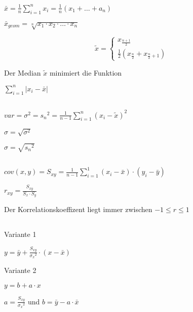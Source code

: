 \documentclass[10pt,a4paper,landscape]{article}
\begin{document}
\begin{multicols*}{4}
\section{}
\subsection{}
\parbox{\columnwidth}{\centering$\bar{x}=\frac{1}{n}\sum \limits_{i=1}^n x_i=\frac{1}{n}(x_1 + \dots + a_n)$}
\parbox{\columnwidth}{\centering$\bar{x}_{geom} = \sqrt[n]{x_1 \cdot x_2 \cdot \dots \cdot x_n}$}
\parbox{\columnwidth}{\centering\[\tilde{x}=\begin{cases}x_{\frac{n+1}{2}}\\\frac{1}{2}(x_{\frac{n}{2}}+x_{\frac{n}{2}+1})\end{cases}\]}
Der Median $\tilde{x}$ minimiert die Funktion
\parbox{\columnwidth}{\centering$\sum \limits_{i=1}^n|x_i- \bar{x}|$}
\subsection{}
\parbox{\columnwidth}{\centering$var = \sigma^2 = {s_n}^2 = \frac{1}{n-1} \sum \limits_{i=1}^n(x_i-\tilde{x})^2$}
\parbox{\columnwidth}{\centering$\sigma = \sqrt{\sigma^2}$}
\parbox{\columnwidth}{\centering$\sigma = \sqrt{{s_n}^2}$}
\subsection{}
\parbox{\columnwidth}{\centering$cov(x,y) = S_{xy} = \frac{1}{n-1}\sum \limits_{i=1}^1(x_i-\bar{x})\cdot(y_i-\bar{y})$}
\parbox{\columnwidth}{\centering$r_{xy} = \frac{S_{xy}}{S_x \cdot S_y}$}
Der Korrelationskoeffizent liegt immer zwischen $-1 \leq r \leq 1$
\subsection{}
\parbox{\columnwidth}{\centering Variante 1}
\parbox{\columnwidth}{\centering$y = \bar{y} + \frac{S_{xy}}{{\sigma_x}^2} \cdot (x-\bar{x})$}
\parbox{\columnwidth}{\centering Variante 2}
\parbox{\columnwidth}{\centering$y = b + a \cdot x$}
\parbox{\columnwidth}{\centering$a = \frac{S_{xy}}{{\sigma_x}^2}$ und $b = \bar{y} - a \cdot \bar{x}$}

\end{multicols*}
\end{document}
